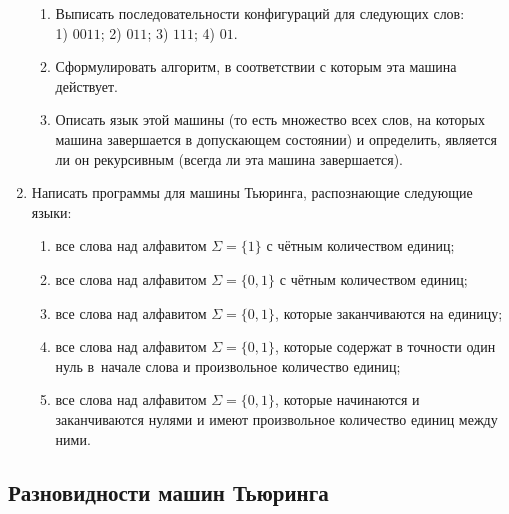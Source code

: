 \documentclass[12pt,a4paper]{article}
\newcommand{\tol}{\shortleftarrow}
\newcommand{\tor}{\shortrightarrow}
\newcommand{\tra}[3]{{\scriptsize $#1/#2\!#3$}}
\begin{document}
\begin{enumerate}[itemsep=0pt]
\begin{center}
\end{center}
\begin{enumerate}
\item Выписать последовательности конфигураций для следующих слов:\\ 1) $0011$; 2) $011$; 
3) $111$; 4) $01$. 
\item Сформулировать алгоритм, в соответствии с которым
эта машина действует. 
\item Описать язык этой машины (то есть множество всех слов, на которых машина 
завершается в допускающем состоянии) и определить, является ли он
рекурсивным (всегда ли эта машина завершается).
\end{enumerate}


\item Написать программы для машины Тьюринга, распознающие следующие языки:
\vspace{-3mm}
  \begin{enumerate}[itemsep=0pt]
  \item все слова над алфавитом $\Sigma=\{1\}$ с чётным количеством единиц;
  \item все слова над алфавитом $\Sigma=\{0,1\}$ с чётным количеством единиц;
  \item все слова над алфавитом $\Sigma=\{0,1\}$, которые заканчиваются на единицу;
  \item все слова над алфавитом $\Sigma=\{0,1\}$, которые содержат в точности один
нуль в~начале слова и произвольное количество единиц;
\vspace{-1mm}
\item все слова над алфавитом $\Sigma=\{0,1\}$, которые начинаются и заканчиваются
нулями и имеют произвольное количество единиц между ними.

  \end{enumerate}

\end{enumerate}


\subsection*{Разновидности машин Тьюринга}
\end{document}
